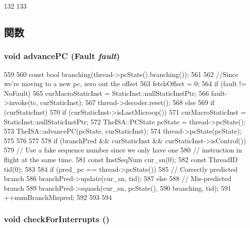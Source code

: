 \begin{DoxyCode}
132 {
133 }
\end{DoxyCode}


\subsection{関数}
\hypertarget{classBaseSimpleCPU_a9ff8fd374877c2ff6c10178aaad00852}{
\subsubsection[{advancePC}]{\setlength{\rightskip}{0pt plus 5cm}void advancePC ({\bf Fault} {\em fault})}}
\label{classBaseSimpleCPU_a9ff8fd374877c2ff6c10178aaad00852}



\begin{DoxyCode}
559 {
560     const bool branching(thread->pcState().branching());
561 
562     //Since we're moving to a new pc, zero out the offset
563     fetchOffset = 0;
564     if (fault != NoFault) {
565         curMacroStaticInst = StaticInst::nullStaticInstPtr;
566         fault->invoke(tc, curStaticInst);
567         thread->decoder.reset();
568     } else {
569         if (curStaticInst) {
570             if (curStaticInst->isLastMicroop())
571                 curMacroStaticInst = StaticInst::nullStaticInstPtr;
572             TheISA::PCState pcState = thread->pcState();
573             TheISA::advancePC(pcState, curStaticInst);
574             thread->pcState(pcState);
575         }
576     }
577 
578     if (branchPred && curStaticInst && curStaticInst->isControl()) {
579         // Use a fake sequence number since we only have one
580         // instruction in flight at the same time.
581         const InstSeqNum cur_sn(0);
582         const ThreadID tid(0);
583 
584         if (pred_pc == thread->pcState()) {
585             // Correctly predicted branch
586             branchPred->update(cur_sn, tid);
587         } else {
588             // Mis-predicted branch
589             branchPred->squash(cur_sn, pcState(),
590                                branching, tid);
591             ++numBranchMispred;
592         }
593     }
594 }
\end{DoxyCode}
\hypertarget{classBaseSimpleCPU_afc6b0526014df091373ec2c850508a55}{
\subsubsection[{checkForInterrupts}]{\setlength{\rightskip}{0pt plus 5cm}void checkForInterrupts ()}}
\label{classBaseSimpleCPU_afc6b0526014df091373ec2c850508a55}



